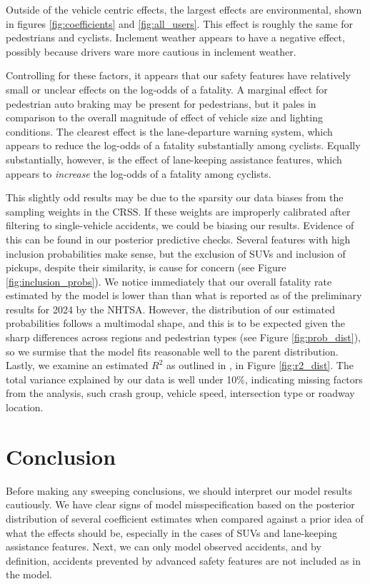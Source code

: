\documentclass[12pt]{article}
\begin{document}
Outside of the vehicle centric effects, the largest effects are environmental, 
shown in figures \ref{fig:coefficients} and \ref{fig:all_users}. This effect is roughly the same for pedestrians and cyclists.
Inclement weather appears to have a negative effect, possibly because drivers ware more cautious in inclement weather.

Controlling for these factors, it appears that our safety features have relatively small or unclear effects on
the log-odds of a fatality. A marginal effect for pedestrian auto braking may be present for pedestrians, but it pales
in comparison to the overall magnitude of effect of vehicle size and lighting conditions.
The clearest effect is the lane-departure warning system, which appears to reduce the
log-odds of a fatality substantially among cyclists. Equally substantially, however, is the effect of lane-keeping
assistance features, which appears to \textit{increase} the log-odds of a fatality among cyclists. 

This slightly odd results may be due to the sparsity our data biases from the sampling weights in the CRSS. 
If these weights are improperly calibrated after filtering to single-vehicle accidents, we could be 
biasing our results. Evidence of this can be found in our posterior predictive checks. 
Several features with high inclusion probabilities make sense, but the exclusion of SUVs and inclusion of pickups, despite their similarity, is cause for concern (see Figure \ref{fig:inclusion_probs}).
We notice immediately that our overall fatality
rate estimated by the model is lower than than what is reported as of the preliminary results for 2024 by the NHTSA. However, the distribution of our estimated probabilities follows
a multimodal shape, and this is to be expected given the sharp differences across regions
and pedestrian types (see Figure \ref{fig:prob_dist}), so we surmise that the model fits reasonable well to the parent distribution. Lastly, we examine an estimated $R^2$ as outlined in \citeauthor{gelman_r-squared_2019}, in Figure \ref{fig:r2_dist}. The total variance explained by our data is well under 10\%, indicating missing factors from the analysis, such crash group, vehicle
speed, intersection type or roadway location.


\section{Conclusion}

Before making any sweeping conclusions, we should interpret our model results cautiously. We have clear signs of model misspecification based on the posterior distribution of several coefficient estimates when compared against a prior idea of what the effects should be, especially in the cases of SUVs and lane-keeping assistance features.  Next, we can only model 
observed accidents, and by definition, accidents prevented by advanced safety features are not included
as in the model. 
\end{document}
